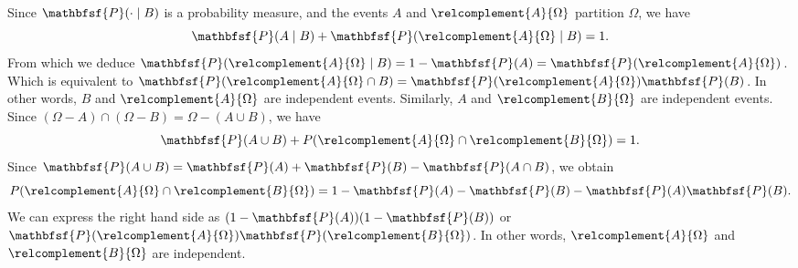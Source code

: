 Since $\mathbfsf{P} (\cdot \mid  B)$ is a probability measure, and the events $A$ and $\relcomplement{A}{\Omega }$ partition $\Omega $, we have
  \[
\mathbfsf{P} (A \mid  B) + \mathbfsf{P} (\relcomplement{A}{\Omega } \mid  B) = 1.
  \]
From which we deduce $\mathbfsf{P} (\relcomplement{A}{\Omega } \mid B) = 1 - \mathbfsf{P} (A) = \mathbfsf{P} (\relcomplement{A}{\Omega })$.
Which is equivalent to $\mathbfsf{P} (\relcomplement{A}{\Omega } \cap B) = \mathbfsf{P} (\relcomplement{A}{\Omega })\mathbfsf{P} (B)$.
In other words, $B$ and $\relcomplement{A}{\Omega }$ are independent events.
Similarly, $A$ and $\relcomplement{B}{\Omega }$ are independent events.
Since $(\Omega  - A) \cap (\Omega  - B) = \Omega  - (A \cup B)$, we have
  \[
\mathbfsf{P} (A \cup B) + P(\relcomplement{A}{\Omega } \cap \relcomplement{B}{\Omega }) = 1.
  \]
Since $\mathbfsf{P} (A \cup B) = \mathbfsf{P} (A) + \mathbfsf{P} (B) - \mathbfsf{P} (A \cap B)$, we obtain
  \[
P(\relcomplement{A}{\Omega } \cap \relcomplement{B}{\Omega }) = 1 - \mathbfsf{P} (A) - \mathbfsf{P} (B) - \mathbfsf{P} (A)\mathbfsf{P} (B).
  \]
We can express the right hand side as $(1 - \mathbfsf{P} (A))(1 - \mathbfsf{P} (B))$ or $\mathbfsf{P} (\relcomplement{A}{\Omega })\mathbfsf{P} (\relcomplement{B}{\Omega })$.
In other words, $\relcomplement{A}{\Omega }$ and $\relcomplement{B}{\Omega }$ are independent.
